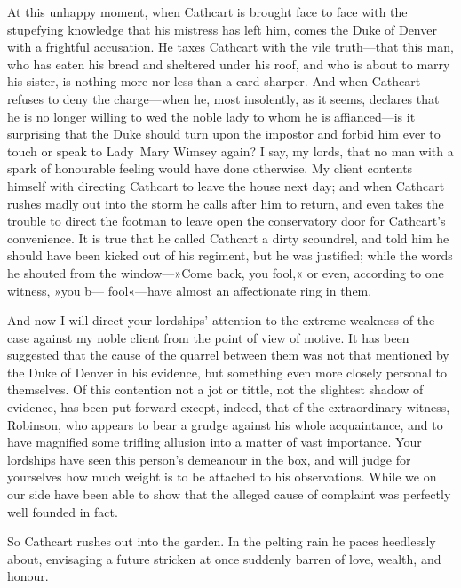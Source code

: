 \begin{dialogue}
\smallskip 

At this unhappy moment, when Cathcart is brought face to face with the stupefying knowledge that his mistress has left him, comes the Duke of Denver with a frightful accusation. He taxes Cathcart with the vile truth—that this man, who has eaten his bread and sheltered under his roof, and who is about to marry his sister, is nothing more nor less than a card-sharper. And when Cathcart refuses to deny the charge—when he, most insolently, as it seems, declares that he is no longer willing to wed the noble lady to whom he is affianced—is it surprising that the Duke should turn upon the impostor and forbid him ever to touch or speak to Lady~Mary Wimsey again? I say, my lords, that no man with a spark of honourable feeling would have done otherwise. My client contents himself with directing Cathcart to leave the house next day; and when Cathcart rushes madly out into the storm he calls after him to return, and even takes the trouble to direct the footman to leave open the conservatory door for Cathcart's convenience. It is true that he called Cathcart a dirty scoundrel, and told him he should have been kicked out of his regiment, but he was justified; while the words he shouted from the window—»Come back, you fool,« or even, according to one witness, »you b— fool«—have almost an affectionate ring in them. 

\smallskip 

And now I will direct your lordships' attention to the extreme weakness of the case against my noble client from the point of view of motive. It has been suggested that the cause of the quarrel between them was not that mentioned by the Duke of Denver in his evidence, but something even more closely personal to themselves. Of this contention not a jot or tittle, not the slightest shadow of evidence, has been put forward except, indeed, that of the extraordinary witness, Robinson, who appears to bear a grudge against his whole acquaintance, and to have magnified some trifling allusion into a matter of vast importance. Your lordships have seen this person's demeanour in the box, and will judge for yourselves how much weight is to be attached to his observations. While we on our side have been able to show that the alleged cause of complaint was perfectly well founded in fact.

\smallskip 

So Cathcart rushes out into the garden. In the pelting rain he paces heedlessly about, envisaging a future stricken at once suddenly barren of love, wealth, and honour.


\end{dialogue}
